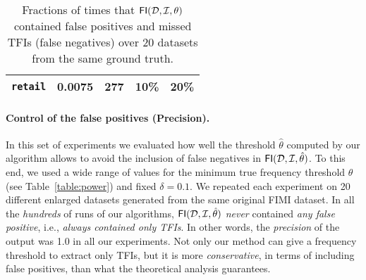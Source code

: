 \begin{table}[htbp]
\begin{tabular}{llrrr}
\midrule
\texttt{retail} & 0.0075 & 277 & 10\% & 20\% \\
\bottomrule
\end{tabular}
\caption{Fractions of times that $\mathsf{FI}({\cal D},{\cal I},\theta)$ contained false positives
and missed TFIs (false negatives) over 20 datasets from the same ground truth.}
\label{table:fp}
\end{table}

\paragraph*{Control of the false positives (Precision).}\label{sec:fwer}
In this set of experiments we evaluated how well the threshold $\hat\theta$
computed by our algorithm allows to avoid the inclusion of false negatives in
$\mathsf{FI}({\cal D},{\cal I},\hat\theta)$. To this end, we used a wide range of values for the
minimum true frequency threshold $\theta$ (see Table~\ref{table:power}) and
fixed $\delta=0.1$. We repeated each experiment on 20 different enlarged
datasets generated from the same original FIMI dataset.
In all the \emph{hundreds} of runs of our algorithms, $\mathsf{FI}({\cal D},{\cal I},\hat\theta)$ \emph{never} contained \emph{any false
positive}, i.e., \emph{always contained only TFIs}. In other words, the
\emph{precision} of the output was 1.0 in all our experiments. Not only our
method can give a frequency threshold to extract only TFIs, but it is more
\emph{conservative}, in terms of including false positives, than what the
theoretical analysis guarantees.

